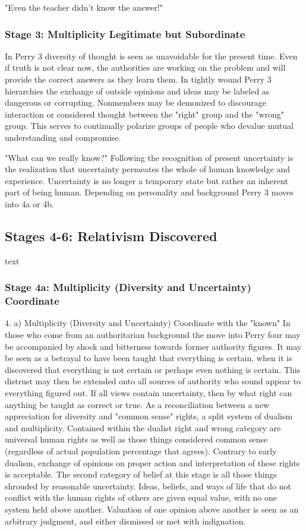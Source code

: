 "Even the teacher didn't know the answer!"

\subsubsection{Stage 3: Multiplicity Legitimate but Subordinate}

In Perry 3 diversity of thought is seen as unavoidable for the present time.  Even if truth is not clear now, the authorities are working on the problem and will provide the correct answers as they learn them.  In tightly wound Perry 3 hierarchies the exchange of outside opinions and ideas may be labeled as dangerous or corrupting.  Nonmembers may be demonized to discourage interaction or considered thought between the "right" group and the "wrong" group.  This serves to continually polarize groups of people who devalue mutual understanding and compromise.

"What can we really know?"
Following the recognition of present uncertainty is the realization that uncertainty permeates the whole of human knowledge and experience.  Uncertainty is no longer a temporary state but rather an inherent part of being human.  Depending on personality and background Perry 3 moves into 4a or 4b.

\subsection{Stages 4-6: Relativism Discovered}

text

\subsubsection{Stage 4a: Multiplicity (Diversity and Uncertainty) Coordinate}


4. a) Multiplicity (Diversity and Uncertainty) Coordinate with the "known"
In those who come from an authoritarian background the move into Perry four may be accompanied by shock and bitterness towards former authority figures.  It may be seen as a betrayal to have been taught that everything is certain, when it is discovered that everything is not certain or perhaps even nothing is certain.  This distrust may then be extended onto all sources of authority who sound appear to everything figured out.  If all views contain uncertainty, then by what right can anything be taught as correct or true.  As a reconciliation between a new appreciation for diversity and "common sense" rights, a split system  of dualism and multiplicity.  Contained within the dualist right and wrong category are universal human rights as well as those things considered common sense (regardless of actual population percentage that agrees).  Contrary to early dualism, exchange of opinions on proper action and interpretation of these rights is acceptable.  The second category of belief at this stage is all those things shrouded by reasonable uncertainty.  Ideas, beliefs, and ways of life that do not conflict with the human rights of others are given equal value, with no one system held above another.    Valuation of one opinion above another is seen as an arbitrary judgment, and either dismissed or met with indignation.

